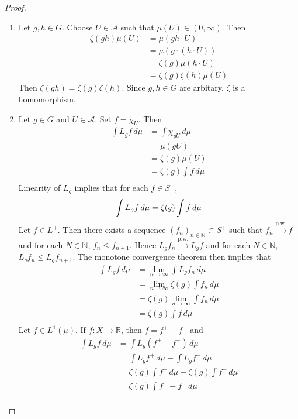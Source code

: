 \documentclass{book}
\theoremstyle{definition}
\newcommand{\N}{\mathbb{N}}
\newcommand{\R}{\mathbb{R}}
\newcommand{\MA}{\mathcal{A}}
\DeclareMathOperator*{\0}{\mbf{0}}
\DeclareMathOperator*{\1}{\mbf{1}}
\newcommand{\limn}{\lim \limits_{n \rightarrow \infty}}
\newcommand{\convt}[1]{\xrightarrow{\text{#1}}}
\newcommand{\dmu}{\, d \mu}
\begin{document}
	\begin{proof}\
		\begin{enumerate}
			\item Let $g,h \in G$. Choose $U \in \MA$ such that $\mu(U) \in (0, \infty)$. Then 
			\begin{align*}
				\zeta(gh) \mu(U)
				&= \mu(gh \cdot U) \\
				&= \mu(g \cdot (h \cdot U)) \\
				&= \zeta(g) \mu(h \cdot U) \\
				&= \zeta(g) \zeta(h) \mu(U)
			\end{align*}
			Then $\zeta(gh) = \zeta(g) \zeta(h)$. Since $g, h \in G$ are arbitary, $\zeta$ is a homomorphism.
			\item Let $g \in G$ and $U \in \MA$. Set $f = \chi_U$. Then 
			\begin{align*}
				\int L_g f \dmu
				&= \int \chi_{gU} \dmu \\
				&= \mu(gU) \\
				&= \zeta(g) \mu(U) \\
				&= \zeta(g) \int f \dmu \\
			\end{align*} 
			Linearity of $L_g$ implies that for each $f \in S^+$, 
			$$\int L_g f \dmu = \zeta(g) \int f \dmu \\$$
			Let $f \in L^+$. Then there exists a sequence $(f_n)_{n \in \N} \subset S^+$ such that $f_n \convt{p.w.} f$ and for each $N \in \N$, $f_n \leq f_{n+1}$. Hence $L_g f_n \convt{p.w.} L_gf$ and for each $N \in \N$, $L_g f_n \leq L_g f_{n+1}$. The monotone convergence theorem then implies that 
			\begin{align*}
				\int L_g f \dmu
				&= \limn \int L_g f_n \dmu \\
				&= \limn \zeta(g) \int f_n \dmu \\ 
				&= \zeta(g) \limn \int f_n \dmu \\ 
				&= \zeta(g) \int f \dmu \\
			\end{align*} 
		Let $f \in L^1(\mu)$. If $f:X \rightarrow \R$, then $f = f^+ - f^-$ and 
		\begin{align*}
			\int L_g f \dmu
			&= \int L_g(f^+ - f^-) \dmu \\
			&= \int L_g f^+ \dmu - \int L_g f^- \dmu \\
			&= \zeta(g) \int f^+ \dmu - \zeta(g) \int f^- \dmu \\
			&= \zeta(g) \int f^+  -  f^- \dmu \\

\end{align*}
\end{enumerate}
\end{proof}
\end{document}
